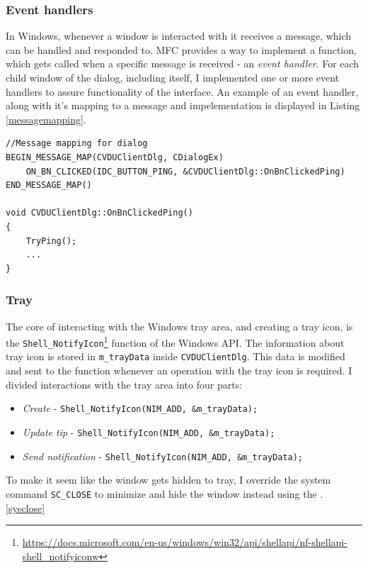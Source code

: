\subsubsection{Event handlers}
In Windows, whenever a window is interacted with it receives a message, which can be handled and responded to. MFC provides a way to implement a function, which gets called when a specific message is received - an \textit{event handler}. For each child window of the dialog, including itself, I implemented one or more event handlers to assure functionality of the interface. An example of an event handler, along with it's mapping to a message and impelementation is displayed in Listing \ref{messagemapping}. 
\newpage
\begin{lstlisting}[caption={Example of implemented and mapped click event handler}, label=messagemapping]
//Message mapping for dialog
BEGIN_MESSAGE_MAP(CVDUClientDlg, CDialogEx)
	ON_BN_CLICKED(IDC_BUTTON_PING, &CVDUClientDlg::OnBnClickedPing)
END_MESSAGE_MAP()

void CVDUClientDlg::OnBnClickedPing()
{
	TryPing();
	...
}
\end{lstlisting}

\subsubsection{Tray}
The core of interacting with the Windows tray area, and creating a tray icon, is the \lstinline{Shell_NotifyIcon}\footnote{\url{https://docs.microsoft.com/en-us/windows/win32/api/shellapi/nf-shellapi-shell_notifyiconw}} function of the Windows API. The information about tray icon is stored in \lstinline{m_trayData} inside \lstinline{CVDUClientDlg}. This data is modified and sent to the function whenever an operation with the tray icon is required. I divided interactions with the tray area into four parts:
\begin{itemize}
    \item \textit{Create } - \lstinline{Shell_NotifyIcon(NIM_ADD, &m_trayData);}
    \item \textit{Update tip} - \lstinline{Shell_NotifyIcon(NIM_ADD, &m_trayData);}
    \item \textit{Send notification} - \lstinline{Shell_NotifyIcon(NIM_ADD, &m_trayData);}
\end{itemize}

To make it seem like the window gets hidden to tray, I override the system command \lstinline{SC_CLOSE} to minimize and hide the window instead using the . \ref{sysclose}

